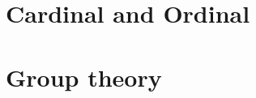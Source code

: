 \documentclass[11pt]{amsart}
\begin{document}
\section{Cardinal and Ordinal}




























\newpage
\section{Group theory}
\end{document}
